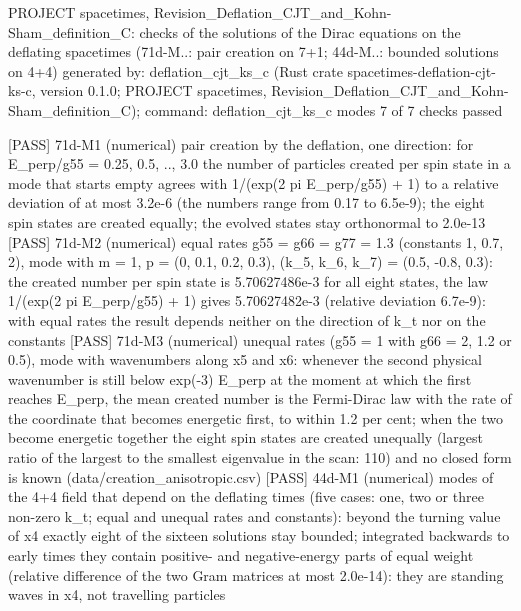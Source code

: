 \documentclass[
  10pt,
]{article}
\newenvironment{Shaded}{}{}
\newcommand{\NormalTok}[1]{#1}
\begin{document}
\begin{Shaded}
\begin{Highlighting}[]
\NormalTok{PROJECT spacetimes, Revision\_Deflation\_CJT\_and\_Kohn{-}Sham\_definition\_C: checks of the solutions of the Dirac equations on the deflating spacetimes (71d{-}M..: pair creation on 7+1; 44d{-}M..: bounded solutions on 4+4)}
\NormalTok{generated by: deflation\_cjt\_ks\_c (Rust crate spacetimes{-}deflation{-}cjt{-}ks{-}c, version 0.1.0; PROJECT spacetimes, Revision\_Deflation\_CJT\_and\_Kohn{-}Sham\_definition\_C); command: deflation\_cjt\_ks\_c modes}
\NormalTok{7 of 7 checks passed}

\NormalTok{[PASS] 71d{-}M1  (numerical) pair creation by the deflation, one direction: for E\_perp/g55 = 0.25, 0.5, .., 3.0 the number of particles created per spin state in a mode that starts empty agrees with 1/(exp(2 pi E\_perp/g55) + 1) to a relative deviation of at most 3.2e{-}6 (the numbers range from 0.17 to 6.5e{-}9); the eight spin states are created equally; the evolved states stay orthonormal to 2.0e{-}13}
\NormalTok{[PASS] 71d{-}M2  (numerical) equal rates g55 = g66 = g77 = 1.3 (constants 1, 0.7, 2), mode with m = 1, p = (0, 0.1, 0.2, 0.3), (k\_5, k\_6, k\_7) = (0.5, {-}0.8, 0.3): the created number per spin state is 5.70627486e{-}3 for all eight states, the law 1/(exp(2 pi E\_perp/g55) + 1) gives 5.70627482e{-}3 (relative deviation 6.7e{-}9): with equal rates the result depends neither on the direction of k\_t nor on the constants}
\NormalTok{[PASS] 71d{-}M3  (numerical) unequal rates (g55 = 1 with g66 = 2, 1.2 or 0.5), mode with wavenumbers along x5 and x6: whenever the second physical wavenumber is still below exp({-}3) E\_perp at the moment at which the first reaches E\_perp, the mean created number is the Fermi{-}Dirac law with the rate of the coordinate that becomes energetic first, to within 1.2 per cent; when the two become energetic together the eight spin states are created unequally (largest ratio of the largest to the smallest eigenvalue in the scan: 110) and no closed form is known (data/creation\_anisotropic.csv)}
\NormalTok{[PASS] 44d{-}M1  (numerical) modes of the 4+4 field that depend on the deflating times (five cases: one, two or three non{-}zero k\_t; equal and unequal rates and constants): beyond the turning value of x4 exactly eight of the sixteen solutions stay bounded; integrated backwards to early times they contain positive{-} and negative{-}energy parts of equal weight (relative difference of the two Gram matrices at most 2.0e{-}14): they are standing waves in x4, not travelling particles}

\end{Highlighting}
\end{Shaded}
\end{document}
